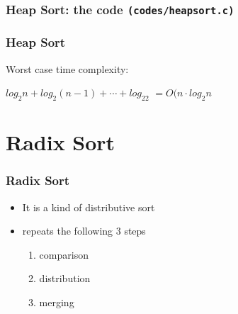 \documentclass[newPxFont,sthlmFooter,nooffset]{beamer}
\begin{document}
\begin{frame}
  \frametitle{Heap Sort: the code \texttt{(codes/heapsort.c)}}
    
\end{frame}


\begin{frame}[t]
  \frametitle{Heap Sort}
Worst case time complexity:

$log_2n + log_2(n-1) + \cdots + log_22$
$=O(n\cdot log_2n$
\end{frame}


\section{Radix Sort}
\begin{frame}[t]
  \frametitle{Radix Sort}
  \begin{itemize}
  \item It is a kind of distributive sort
  \item repeats the following 3 steps
    \begin{enumerate}
    \item comparison
    \item distribution
    \item merging
    \end{enumerate}

  \end{itemize}
\end{frame}
\end{document}
